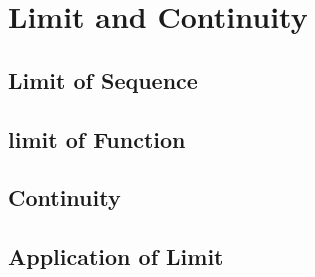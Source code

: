 \chapterspaceabove{6.75cm} 
\chapterspacebelow{7.25cm} 
\chapter{Limit and Continuity}
    \section{Limit of Sequence}


    \section{limit of Function}


    \section{Continuity}


    \section{Application of Limit}